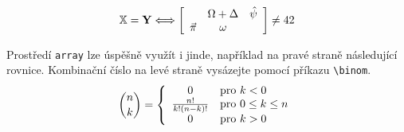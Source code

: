\documentclass[a4paper,twocolumn,11pt]{article}[06-03-2022]
\theoremstyle{definition}
\begin{document}
\begin{displaymath}
    \mathbb{X} = \mathbf{Y} \Longleftrightarrow \left [
    \begin{array}{c c c}
                  & \Omega + \Delta & \hat{\psi} \\
        \vec{\pi} & \omega          &
    \end{array}
    \right ] \neq 42
\end{displaymath}

Prostředí \texttt{array} lze úspěšně využít i jinde, například na pravé straně následující rovnice. 
Kombinační číslo na levé straně vysázejte pomocí příkazu \verb|\binom|.
\begin{displaymath}
    \binom{n}{k} = \left \{
    \begin{array}{c l}
        0                   & \textrm{pro } k < 0 \\
        \frac{n!}{k!(n-k)!} & \textrm{pro } 0 \leq k \leq n \\
        0                   & \textrm{pro } k > 0 
    \end{array}
    \right.
\end{displaymath}
\end{document}
